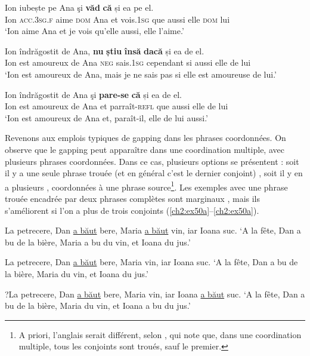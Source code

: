 \ex  
\gll Ion    iubește  pe  Ana  şi  \textbf{văd} \textbf{că}  și  ea  pe  el. \label{ch2:ex48b}\\
Ion  \textsc{acc.3sg.f}  aime  \textsc{dom} Ana  et  vois.\textsc{1sg}  que  aussi  elle  \textsc{dom} lui\\
\glt  ‘Ion aime Ana et je vois qu'elle aussi, elle l’aime.’   

\ex 
\gll Ion    îndrăgostit  de  Ana,  \textbf{nu} \textbf{știu} \textbf{însă} \textbf{dacă}  și  ea  de  el. \label{ch2:ex48c} \\
Ion  est  amoureux  de  Ana  \textsc{neg}  sais.\textsc{1sg}  cependant  si  aussi  elle  de  lui\\ 
\glt  ‘Ion est amoureux de Ana, mais je ne sais pas si elle est amoureuse de lui.’ 

\ex  
\gll Ion    îndrăgostit  de  Ana  şi  \textbf{pare-se} \textbf{că}  și  ea  de  el. \label{ch2:ex48d}\\
Ion  est  amoureux  de  Ana  et  parraît-\textsc{refl}  que  aussi  elle  de  lui\\
\glt  ‘Ion est amoureux de Ana et, paraît-il, elle de lui aussi.’ 
\z
\z

Revenons aux emplois typiques de gapping dans les phrases coordonnées. On observe que le gapping peut apparaître dans une coordination multiple, avec plusieurs phrases coordonnées. Dans ce cas, plusieurs options se présentent : soit il y a une seule phrase trouée (et en général c’est le dernier conjoint) , soit il y en a plusieurs , coordonnées à une phrase source\footnote{
 A priori, l’anglais serait différent, selon \citet{McCawley1988}, qui note que, dans une coordination multiple, tous les conjoints sont troués, sauf le premier.}. Les exemples avec une phrase trouée encadrée par deux phrases complètes sont marginaux , mais ils s’améliorent si l’on a plus de trois conjoints (\ref{ch2:ex50a}--\ref{ch2:ex50a}). 

\ea
\ea La petrecere, Dan \uline{a băut} bere, Maria \uline{a băut} vin, iar Ioana suc. \label{ch2:ex49a}
\glt  ‘A la fête, Dan a bu de la bière, Maria a bu du vin, et Ioana du jus.’   

\ex  La petrecere, Dan \uline{a băut} bere, Maria vin, iar Ioana suc. \label{ch2:ex49b}
\glt  ‘A la fête, Dan a bu de la bière, Maria du vin, et Ioana du jus.’  

\ex  ?La petrecere, Dan \uline{a băut} bere, Maria vin, iar Ioana \uline{a băut} suc. \label{ch2:ex49c}
\glt  ‘A la fête, Dan a bu de la bière, Maria du vin, et Ioana a bu du jus.’
\z
\z

